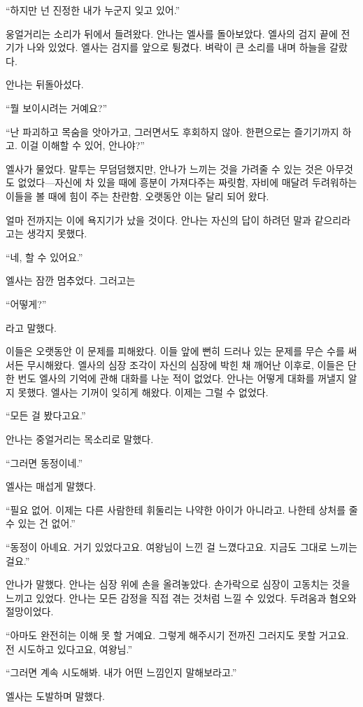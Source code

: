 ``하지만 넌 진정한 내가 누군지 잊고 있어.''

웅얼거리는 소리가 뒤에서 들려왔다. 안나는 엘사를 돌아보았다. 엘사의 검지 끝에 전기가 나와 있었다. 엘사는 검지를 앞으로 튕겼다. 벼락이 큰 소리를 내며 하늘을 갈랐다.

안나는 뒤돌아섰다.

``뭘 보이시려는 거예요?''

``난 파괴하고 목숨을 앗아가고, 그러면서도 후회하지 않아. 한편으로는 즐기기까지 하고. 이걸 이해할 수 있어, 안나야?''

엘사가 물었다. 말투는 무덤덤했지만, 안나가 느끼는 것을 가려줄 수 있는 것은 아무것도 없었다—자신에 차 있을 때에 흥분이 가져다주는 짜릿함, 자비에 매달려 두려워하는 이들을 볼 때에 힘이 주는 찬란함. 오랫동안 이는 달리 되어 왔다.

얼마 전까지는 이에 욕지기가 났을 것이다. 안나는 자신의 답이 하려던 말과 같으리라고는 생각지 못했다.

``네, 할 수 있어요.''

엘사는 잠깐 멈추었다. 그러고는

``어떻게?''

라고 말했다.

이들은 오랫동안 이 문제를 피해왔다. 이들 앞에 뻔히 드러나 있는 문제를 무슨 수를 써서든 무시해왔다. 엘사의 심장 조각이 자신의 심장에 박힌 채 깨어난 이후로, 이들은 단 한 번도 엘사의 기억에 관해 대화를 나눈 적이 없었다. 안나는 어떻게 대화를 꺼낼지 알지 못했다. 엘사는 기꺼이 잊히게 해왔다. 이제는 그럴 수 없었다.

``모든 걸 봤다고요.''

안나는 중얼거리는 목소리로 말했다.

``그러면 동정이네.''

엘사는 매섭게 말했다.

``필요 없어. 이제는 다른 사람한테 휘둘리는 나약한 아이가 아니라고. 나한테 상처를 줄 수 있는 건 없어.''

``동정이 아녜요. 거기 있었다고요. 여왕님이 느낀 걸 느꼈다고요. 지금도 그대로 느끼는걸요.''

안나가 말했다. 안나는 심장 위에 손을 올려놓았다. 손가락으로 심장이 고동치는 것을 느끼고 있었다. 안나는 모든 감정을 직접 겪는 것처럼 느낄 수 있었다. 두려움과 혐오와 절망이었다.

``아마도 완전히는 이해 못 할 거예요. 그렇게 해주시기 전까진 그러지도 못할 거고요. 전 시도하고 있다고요, 여왕님.''

``그러면 계속 시도해봐. 내가 어떤 느낌인지 말해보라고.''

엘사는 도발하며 말했다.

